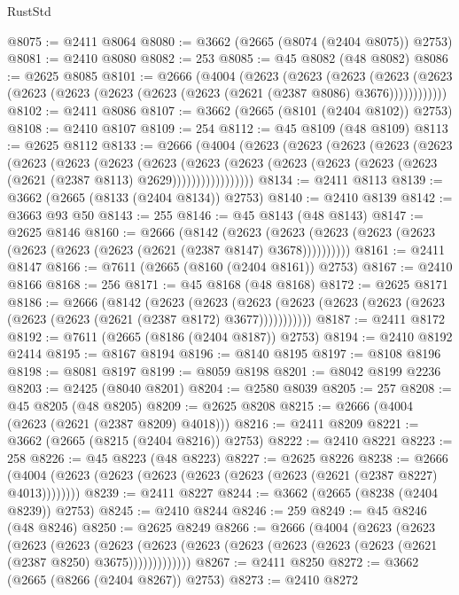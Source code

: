 \begin{lexlean}{RustStd}
\begin{coremodule}
@8075 := @2411 @8064
@8080 := @3662 (@2665 (@8074 (@2404 @8075)) @2753)
@8081 := @2410 @8080
@8082 := 253
@8085 := @45 @8082 (@48 @8082)
@8086 := @2625 @8085
@8101 := @2666
    (@4004
      (@2623
        (@2623
          (@2623
            (@2623 (@2623 (@2623 (@2623 (@2623 (@2623 (@2623 (@2621 (@2387 @8086) @3676))))))))))))
@8102 := @2411 @8086
@8107 := @3662 (@2665 (@8101 (@2404 @8102)) @2753)
@8108 := @2410 @8107
@8109 := 254
@8112 := @45 @8109 (@48 @8109)
@8113 := @2625 @8112
@8133 := @2666
    (@4004
      (@2623
        (@2623
          (@2623
            (@2623
              (@2623
                (@2623
                  (@2623
                    (@2623
                      (@2623
                        (@2623
                          (@2623
                            (@2623 (@2623 (@2623 (@2623 (@2621 (@2387 @8113) @2629)))))))))))))))))
@8134 := @2411 @8113
@8139 := @3662 (@2665 (@8133 (@2404 @8134)) @2753)
@8140 := @2410 @8139
@8142 := @3663 @93 @50
@8143 := 255
@8146 := @45 @8143 (@48 @8143)
@8147 := @2625 @8146
@8160 := @2666
    (@8142
      (@2623 (@2623 (@2623 (@2623 (@2623 (@2623 (@2623 (@2623 (@2621 (@2387 @8147) @3678))))))))))
@8161 := @2411 @8147
@8166 := @7611 (@2665 (@8160 (@2404 @8161)) @2753)
@8167 := @2410 @8166
@8168 := 256
@8171 := @45 @8168 (@48 @8168)
@8172 := @2625 @8171
@8186 := @2666
    (@8142
      (@2623
        (@2623
          (@2623 (@2623 (@2623 (@2623 (@2623 (@2623 (@2623 (@2621 (@2387 @8172) @3677)))))))))))
@8187 := @2411 @8172
@8192 := @7611 (@2665 (@8186 (@2404 @8187)) @2753)
@8194 := @2410 @8192 @2414
@8195 := @8167 @8194
@8196 := @8140 @8195
@8197 := @8108 @8196
@8198 := @8081 @8197
@8199 := @8059 @8198
@8201 := @8042 @8199 @2236
@8203 := @2425 (@8040 @8201)
@8204 := @2580 @8039
@8205 := 257
@8208 := @45 @8205 (@48 @8205)
@8209 := @2625 @8208
@8215 := @2666 (@4004 (@2623 (@2621 (@2387 @8209) @4018)))
@8216 := @2411 @8209
@8221 := @3662 (@2665 (@8215 (@2404 @8216)) @2753)
@8222 := @2410 @8221
@8223 := 258
@8226 := @45 @8223 (@48 @8223)
@8227 := @2625 @8226
@8238 := @2666 (@4004 (@2623 (@2623 (@2623 (@2623 (@2623 (@2623 (@2621 (@2387 @8227) @4013))))))))
@8239 := @2411 @8227
@8244 := @3662 (@2665 (@8238 (@2404 @8239)) @2753)
@8245 := @2410 @8244
@8246 := 259
@8249 := @45 @8246 (@48 @8246)
@8250 := @2625 @8249
@8266 := @2666
    (@4004
      (@2623
        (@2623
          (@2623
            (@2623
              (@2623
                (@2623 (@2623 (@2623 (@2623 (@2623 (@2623 (@2621 (@2387 @8250) @3675)))))))))))))
@8267 := @2411 @8250
@8272 := @3662 (@2665 (@8266 (@2404 @8267)) @2753)
@8273 := @2410 @8272

\end{coremodule}
\end{lexlean}

